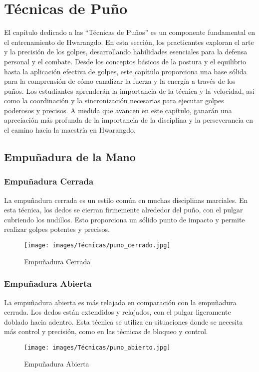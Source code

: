 \chapter{Técnicas de Puño}

El capítulo dedicado a las ``Técnicas de Puños'' es un componente fundamental en el entrenamiento de Hwarangdo\textregistered. En esta sección, los practicantes exploran el arte y la precisión de los golpes, desarrollando habilidades esenciales para la defensa personal y el combate. Desde los conceptos básicos de la postura y el equilibrio hasta la aplicación efectiva de golpes, este capítulo proporciona una base sólida para la comprensión de cómo canalizar la fuerza y la energía a través de los puños. Los estudiantes aprenderán la importancia de la técnica y la velocidad, así como la coordinación y la sincronización necesarias para ejecutar golpes poderosos y precisos. A medida que avancen en este capítulo, ganarán una apreciación más profunda de la importancia de la disciplina y la perseverancia en el camino hacia la maestría en Hwarangdo\textregistered.

\section{Empuñadura de la Mano}

\subsection{Empuñadura Cerrada}

La empuñadura cerrada es un estilo común en muchas disciplinas marciales. En esta técnica, los dedos se cierran firmemente alrededor del puño, con el pulgar cubriendo los nudillos. Esto proporciona un sólido punto de impacto y permite realizar golpes potentes y precisos.

\begin{figure}[h]
	\centering
	\texttt{[image: images/Técnicas/puno\_cerrado.jpg]}
	\caption{Empuñadura Cerrada}
\end{figure}

\subsection{Empuñadura Abierta}

La empuñadura abierta es más relajada en comparación con la empuñadura cerrada. Los dedos están extendidos y relajados, con el pulgar ligeramente doblado hacia adentro. Esta técnica se utiliza en situaciones donde se necesita más control y precisión, como en las técnicas de bloqueo y control.

\begin{figure}[h]
	\centering
	\texttt{[image: images/Técnicas/puno\_abierto.jpg]}
	\caption{Empuñadura Abierta}
\end{figure}

